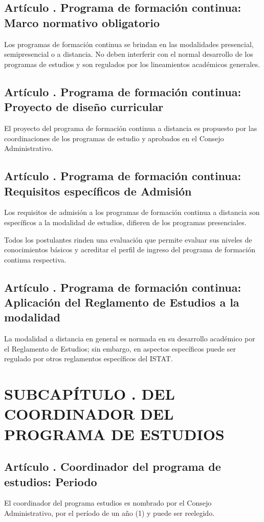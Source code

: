 \subsection{Artículo . Programa de formación continua: Marco normativo obligatorio}
\addtocounter{ns}{1}
Los programas de formación continua se brindan en las modalidades presencial, semipresencial o a distancia. No deben interferir con el normal desarrollo de los programas de estudios y son regulados por los lineamientos académicos generales. 
\subsection{Artículo . Programa de formación continua: Proyecto de diseño curricular}
\addtocounter{ns}{1}
El proyecto del programa de formación continua a distancia es propuesto por las coordinaciones de los programas de estudio y aprobados en el Consejo Administrativo. 
\subsection{Artículo . Programa de formación continua: Requisitos específicos de Admisión}
\addtocounter{ns}{1}
Los requisitos de admisión a los programas de formación continua a distancia son específicos a la modalidad de estudios, difieren de los programas presenciales.  

Todos los postulantes rinden una evaluación que permite evaluar sus niveles de conocimientos básicos y acreditar el perfil de ingreso del programa de formación continua respectiva. 
\subsection{Artículo . Programa de formación continua: Aplicación del Reglamento de Estudios a la modalidad}
\addtocounter{ns}{1}
La modalidad a distancia en general es normada en su desarrollo académico por el Reglamento de Estudios; sin embargo, en aspectos específicos puede ser regulado por otros reglamentos específicos del ISTAT. 
\section{SUBCAPÍTULO . DEL COORDINADOR DEL PROGRAMA DE ESTUDIOS}
\setcounter{re}{1}
\subsection{Artículo . Coordinador del programa de estudios: Periodo }
\addtocounter{ns}{1}
El coordinador del programa estudios es nombrado por el Consejo Administrativo, por el período de un año (1) y puede ser reelegido.
